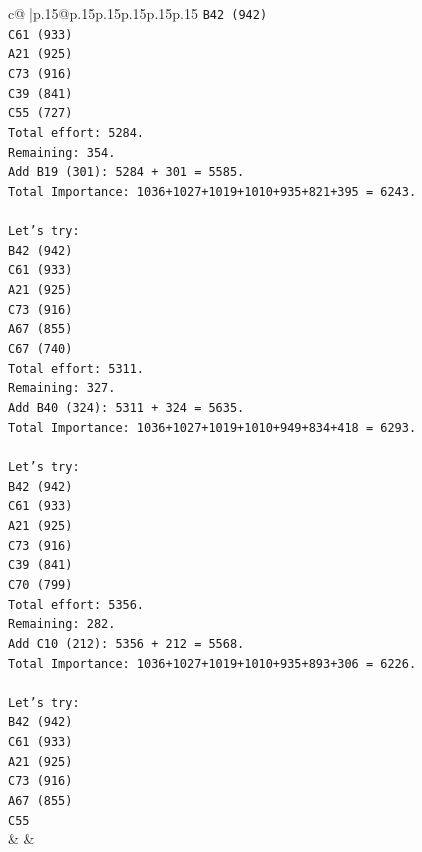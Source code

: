\documentclass{article}
\begin{document}
{\begin{supertabular}{c@{$\;$}|p{.15\linewidth}@{}p{.15\linewidth}p{.15\linewidth}p{.15\linewidth}p{.15\linewidth}p{.15\linewidth}}
{{{\texttt{B42 (942)} \\
\texttt{C61 (933)} \\
\texttt{A21 (925)} \\
\texttt{C73 (916)} \\
\texttt{C39 (841)} \\
\texttt{C55 (727)} \\
\texttt{Total effort: 5284.} \\
\texttt{Remaining: 354.} \\
\texttt{Add B19 (301): 5284 + 301 = 5585.} \\
\texttt{Total Importance: 1036+1027+1019+1010+935+821+395 = 6243.} \\
\\ 
\texttt{Let's try:} \\
\texttt{B42 (942)} \\
\texttt{C61 (933)} \\
\texttt{A21 (925)} \\
\texttt{C73 (916)} \\
\texttt{A67 (855)} \\
\texttt{C67 (740)} \\
\texttt{Total effort: 5311.} \\
\texttt{Remaining: 327.} \\
\texttt{Add B40 (324): 5311 + 324 = 5635.} \\
\texttt{Total Importance: 1036+1027+1019+1010+949+834+418 = 6293.} \\
\\ 
\texttt{Let's try:} \\
\texttt{B42 (942)} \\
\texttt{C61 (933)} \\
\texttt{A21 (925)} \\
\texttt{C73 (916)} \\
\texttt{C39 (841)} \\
\texttt{C70 (799)} \\
\texttt{Total effort: 5356.} \\
\texttt{Remaining: 282.} \\
\texttt{Add C10 (212): 5356 + 212 = 5568.} \\
\texttt{Total Importance: 1036+1027+1019+1010+935+893+306 = 6226.} \\
\\ 
\texttt{Let's try:} \\
\texttt{B42 (942)} \\
\texttt{C61 (933)} \\
\texttt{A21 (925)} \\
\texttt{C73 (916)} \\
\texttt{A67 (855)} \\
\texttt{C55} \\
            }
        }
    }
    & & \\ \\


\end{supertabular}}
\end{document}
